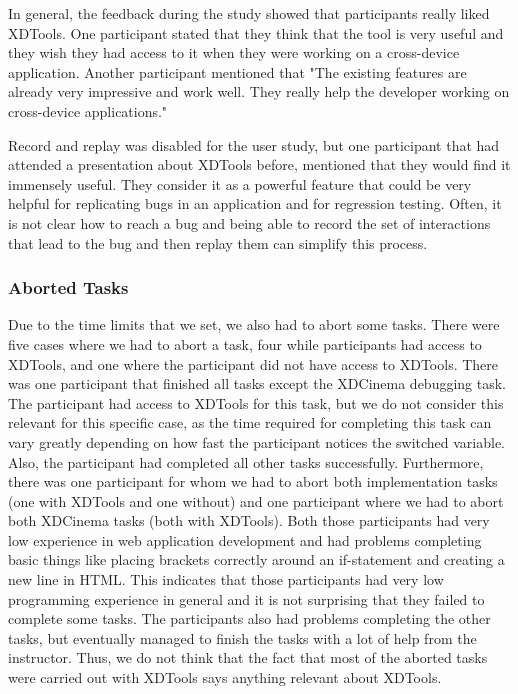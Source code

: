 In general, the feedback during the study showed that participants really liked XDTools. One participant stated that they think that the tool is very useful and they wish they had access to it when they were working on a cross-device application. Another participant mentioned that "The existing features are already very impressive and work well. They really help the developer working on cross-device applications."

Record and replay was disabled for the user study, but one participant that had attended a presentation about XDTools before, mentioned that they would find it immensely useful. They consider it as a powerful feature that could be very helpful for replicating bugs in an application and for regression testing. Often, it is not clear how to reach a bug and being able to record the set of interactions that lead to the bug and then replay them can simplify this process.

\subsubsection{Aborted Tasks}

Due to the time limits that we set, we also had to abort some tasks. There were five cases where we had to abort a task, four while participants had access to XDTools, and one where the participant did not have access to XDTools. There was one participant that finished all tasks except the XDCinema debugging task. The participant had access to XDTools for this task, but we do not consider this relevant for this specific case, as the time required for completing this task can vary greatly depending on how fast the participant notices the switched variable. Also, the participant had completed all other tasks successfully. Furthermore, there was one participant for whom we had to abort both implementation tasks (one with XDTools and one without) and one participant where we had to abort both XDCinema tasks (both with XDTools). Both those participants had very low experience in web application development and had problems completing basic things like placing brackets correctly around an if-statement and creating a new line in HTML. This indicates that those participants had very low programming experience in general and it is not surprising that they failed to complete some tasks. The participants also had problems completing the other tasks, but eventually managed to finish the tasks with a lot of help from the instructor. Thus, we do not think that the fact that most of the aborted tasks were carried out with XDTools says anything relevant about XDTools. 

